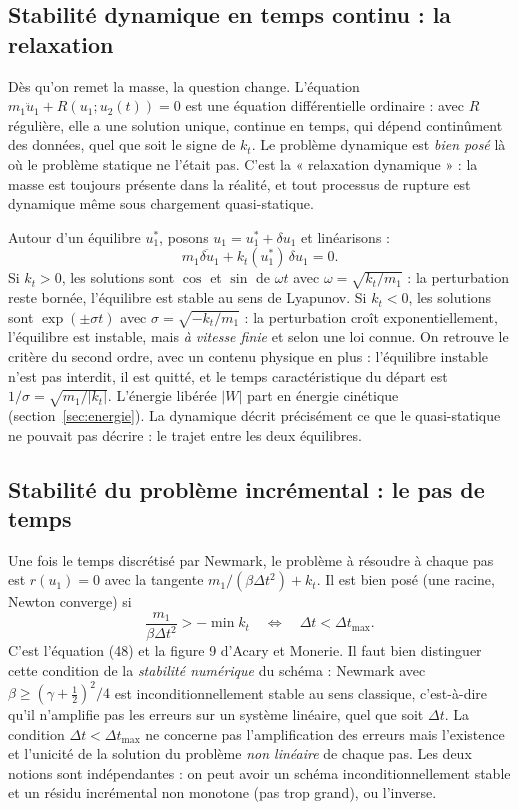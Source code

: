 \documentclass[11pt,a4paper]{article}
\begin{document}
\subsection{Stabilité dynamique en temps continu : la relaxation}
Dès qu'on remet la masse, la question change. L'équation $m_1\ddot u_1 + R(u_1;u_2(t)) = 0$ est
une équation différentielle ordinaire : avec $R$ régulière, elle a une solution unique,
continue en temps, qui dépend continûment des données, quel que soit le signe de $k_t$. Le
problème dynamique est \emph{bien posé} là où le problème statique ne l'était pas. C'est la
« relaxation dynamique » : la masse est toujours présente dans la réalité, et tout processus
de rupture est dynamique même sous chargement quasi-statique.

Autour d'un équilibre $u_1^*$, posons $u_1 = u_1^* + \delta u_1$ et linéarisons :
\begin{equation}
  m_1\ddot{\delta u_1} + k_t(u_1^*)\,\delta u_1 = 0 .
\end{equation}
Si $k_t > 0$, les solutions sont $\cos$ et $\sin$ de $\omega t$ avec $\omega = \sqrt{k_t/m_1}$ :
la perturbation reste bornée, l'équilibre est stable au sens de Lyapunov. Si $k_t < 0$, les
solutions sont $\exp(\pm\sigma t)$ avec $\sigma = \sqrt{-k_t/m_1}$ : la perturbation croît
exponentiellement, l'équilibre est instable, mais \emph{à vitesse finie} et selon une loi
connue. On retrouve le critère du second ordre, avec un contenu physique en plus : l'équilibre
instable n'est pas interdit, il est quitté, et le temps caractéristique du départ est
$1/\sigma = \sqrt{m_1/|k_t|}$. L'énergie libérée $|W|$ part en énergie cinétique
(section~\ref{sec:energie}). La dynamique décrit précisément ce que le quasi-statique ne
pouvait pas décrire : le trajet entre les deux équilibres.

\subsection{Stabilité du problème incrémental : le pas de temps}
Une fois le temps discrétisé par Newmark, le problème à résoudre à chaque pas est
$r(u_1) = 0$ avec la tangente $m_1/(\beta\Delta t^2) + k_t$. Il est bien posé (une racine, Newton
converge) si
\begin{equation}
  \frac{m_1}{\beta\Delta t^2} > -\min k_t
  \quad\Longleftrightarrow\quad
  \Delta t < \Delta t_{\max} .
\end{equation}
C'est l'équation (48) et la figure 9 d'Acary et Monerie. Il faut bien distinguer cette
condition de la \emph{stabilité numérique} du schéma : Newmark avec $\beta\ge(\gamma+\tfrac12)^2/4$
est inconditionnellement stable au sens classique, c'est-à-dire qu'il n'amplifie pas les
erreurs sur un système linéaire, quel que soit $\Delta t$. La condition $\Delta t < \Delta t_{\max}$
ne concerne pas l'amplification des erreurs mais l'existence et l'unicité de la solution du
problème \emph{non linéaire} de chaque pas. Les deux notions sont indépendantes : on peut
avoir un schéma inconditionnellement stable et un résidu incrémental non monotone (pas trop
grand), ou l'inverse.
\end{document}
